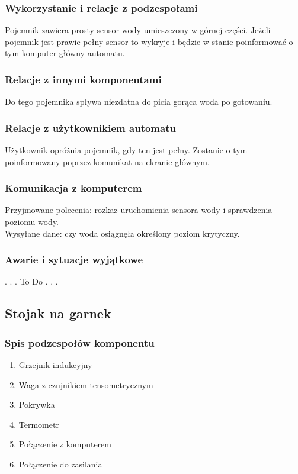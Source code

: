 \documentclass[12pt,a4paper,notitlepage]{report}
\begin{document}
\subsubsection{Wykorzystanie i relacje z podzespołami}
Pojemnik zawiera prosty sensor wody umieszczony w górnej części. Jeżeli pojemnik jest prawie pełny sensor to wykryje i będzie w stanie poinformować o tym komputer główny automatu.

\subsubsection{Relacje z innymi komponentami}
Do tego pojemnika spływa niezdatna do picia gorąca woda po gotowaniu.

\subsubsection{Relacje z użytkownikiem automatu}
Użytkownik opróżnia pojemnik, gdy ten jest pełny. Zostanie o tym poinformowany poprzez komunikat na ekranie głównym.

\subsubsection{Komunikacja z komputerem}
Przyjmowane polecenia: rozkaz uruchomienia sensora wody i sprawdzenia poziomu wody.\\
Wysyłane dane: czy woda osiągnęła określony poziom krytyczny.

\subsubsection{Awarie i sytuacje wyjątkowe}
. . . To Do . . .



\subsection{Stojak na garnek}
\subsubsection{Spis podzespołów komponentu}
\begin{enumerate}
  \item Grzejnik indukcyjny
  \item Waga z czujnikiem tensometrycznym
  \item Pokrywka
  \item Termometr
  \item Połączenie z komputerem
  \item Połączenie do zasilania
\end{enumerate}
\end{document}
